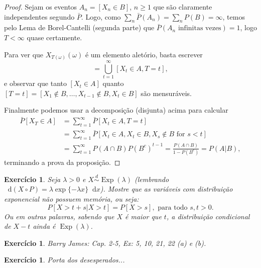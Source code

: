 \documentclass[reqno]{article}
\newcommand*\1{\mathds{1}}
\DeclareMathOperator{\Exp}{Exp}
\def \distr {\overset{d}{\sim}}
\newtheorem{exercise}[example]{Exercício}
\renewcommand*\d{\mathop{}\!\mathrm{d}}
\newcommand{\mcup}{\textstyle \bigcup\limits}
\begin{document}
\begin{proof}
  Sejam os eventos $A_n = [X_n \in B]$, $n \geq 1$ que são claramente independentes segundo $\bar{P}$.
  Logo, como $\sum_n \bar{P}(A_n) = \sum_n P(B) = \infty$, temos pelo Lema de Borel-Cantelli (segunda parte) que $\bar{P}(\text{$A_n$ infinitas vezes}) = 1$, logo $T < \infty$ quase certamente.

  Para ver que $X_{T(\omega)}(\omega)$ é um elemento aletório, basta escrever
  \begin{equation}
    [X_{T} \in A] = \mcup_{t=1}^\infty [X_t \in A, T = t],
  \end{equation}
  e observar que tanto $[X_t \in A]$ quanto $[T = t] = [X_1 \not \in B, \dots, X_{t-1} \not \in B, X_t \in B]$ são mensuráveis.

  Finalmente podemos usar a decomposição (disjunta) acima para calcular
  \begin{equation}
    \begin{split}
      \bar{P}[X_T \in A] & = \sum_{t=1}^\infty \bar{P} [X_t \in A, T = t]\\
      & = \sum_{t=1}^\infty \bar{P} [X_t \in A, X_t \in B, X_s \not \in B \text{ for $s < t$}]\\
      & = \sum_{t=1}^\infty P(A \cap B) P(B^c)^{t-1} = \frac{P(A \cap B)}{1-P(B^c)} = P(A | B),
    \end{split}
  \end{equation}
  terminando a prova da proposição.
\end{proof}

\begin{exercise}
  Seja $\lambda > 0$ e $X \distr \Exp(\lambda)$ (lembrando $\d (X \circ P) = \lambda \exp\{- \lambda x\} \d x$).
  Mostre que as variáveis com distribuição exponencial não possuem memória, ou seja:
  \begin{equation}
    P[X > t + s | X > t] = P [X > s], \text{ para todo $s, t > 0$}.
  \end{equation}
  Ou em outras palavras, sabendo que $X$ é maior que $t$, a distribuição condicional de $X - t$ ainda é $\Exp(\lambda)$.
\end{exercise}

\begin{exercise}
  Barry James: Cap. 2-5, Ex: 5, 10, 21, 22 (a) e (b).
\end{exercise}

\begin{exercise}
  Porta dos desesperados...
\end{exercise}
\end{document}
